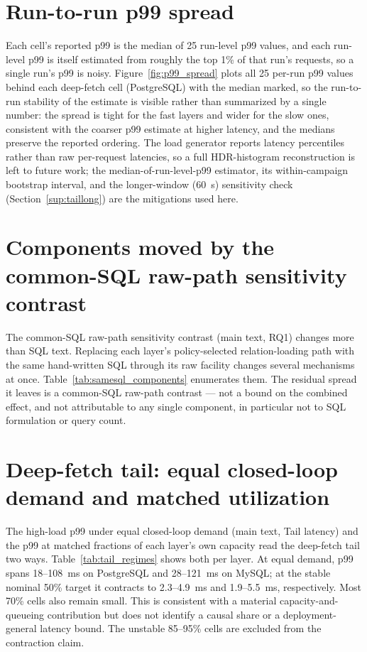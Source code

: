 \documentclass[11pt,a4paper]{article}
\newcommand{\tabledir}{tables/}
\begin{document}


\section{Run-to-run p99 spread}
\label{sup:p99-spread}
Each cell's reported p99 is the median of 25 run-level p99 values, and each run-level p99 is itself
estimated from roughly the top 1\% of that run's requests, so a single run's p99 is noisy.
Figure~\ref{fig:p99_spread} plots all 25 per-run p99 values behind each deep-fetch cell (PostgreSQL)
with the median marked, so the run-to-run stability of the estimate is visible rather than summarized
by a single number: the spread is tight for the fast layers and wider for the slow ones, consistent
with the coarser p99 estimate at higher latency, and the medians preserve the reported ordering. The
load generator reports latency percentiles rather than raw per-request latencies, so a full
HDR-histogram reconstruction is left to future work; the median-of-run-level-p99 estimator, its
within-campaign bootstrap interval, and the longer-window (60~s) sensitivity check
(Section~\ref{sup:taillong}) are the mitigations used here.



\section{Components moved by the common-SQL raw-path sensitivity contrast}
\label{sup:samesql-components}
The common-SQL raw-path sensitivity contrast (main text, RQ1) changes more than SQL text. Replacing each layer's policy-selected relation-loading path with the same hand-written SQL through its raw facility changes several mechanisms at once. Table~\ref{tab:samesql_components} enumerates them. The
residual spread it leaves is a common-SQL raw-path contrast --- not a bound on the combined effect, and
not attributable to any single component, in particular not to SQL formulation or query count.



\section{Deep-fetch tail: equal closed-loop demand and matched utilization}
\label{sup:tailregimes}
The high-load p99 under equal closed-loop demand (main text, Tail latency) and the p99 at matched
fractions of each layer's own capacity read the deep-fetch tail two ways. Table~\ref{tab:tail_regimes}
shows both per layer. At equal demand, p99 spans 18--108~ms on PostgreSQL
and 28--121~ms on MySQL; at the stable nominal 50\% target it contracts to
2.3--4.9~ms and 1.9--5.5~ms, respectively. Most 70\% cells also remain small.
This is consistent with a material capacity-and-queueing contribution but does not
identify a causal share or a deployment-general latency bound. The unstable
85--95\% cells are excluded from the contraction claim.
\end{document}
